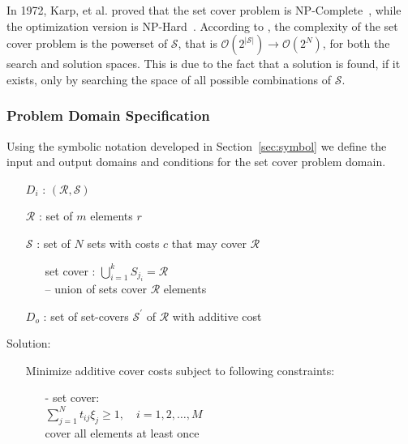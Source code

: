 \documentclass[conference]{IEEEtran}
\newcommand{\bigoh}[1]{\ensuremath{\mathcal{O}(#1)}}		%
\begin{document}
In 1972, Karp, et al. proved that the set cover problem is
NP-Complete~\cite{karp1972}, while the optimization version is
NP-Hard~\cite{wiki:SCP}. According to \cite{wiki:SCP, lamontSCP}, the
complexity of the set cover problem is the powerset of $\mathcal{S}$, that is
${\bigoh{2^{|\mathcal{S}|}} \rightarrow \bigoh{2^N}}$, for both the search and
solution spaces. This is due to the fact that a solution is found, if it
exists, only by searching the space of all possible combinations of
$\mathcal{S}$.

\subsubsection{Problem Domain Specification}
Using the symbolic notation developed in Section~\ref{sec:symbol} we define the
input and output domains and conditions for the set cover problem domain.

\begin{enumerate}
  \item[] $D_i$ : $(\mathcal{R,S})$
  \item[] $\mathcal{R}$ : set of $m$ elements $r$
  \item[] $\mathcal{S}$ : set of $N$ sets with costs $c$ that may cover
    $\mathcal{R}$
    \begin{enumerate}
      \item[] set cover : $\bigcup\limits_{i=1}^k S_{j_i} =
        \mathcal{R}$~\cite[Eq.~3.12]{christofides1975}\\ 
        -- union of sets cover $\mathcal{R}$
        elements
    \end{enumerate}
  \item[] $D_o$ : set of set-covers $\mathcal{S}^\prime$ of $\mathcal{R}$ with
    additive cost
\end{enumerate}

Solution:
\begin{enumerate}
  \item[] Minimize additive cover costs subject to following constraints:
    \begin{enumerate}
      \item[-] set cover:\\
        $\sum\limits_{j=1}^N t_{ij} \xi_j \geq 1, \quad i =
        1,2,\ldots,M$~\cite[Eq.  3.14]{christofides1975}\\
        cover all elements at least once
    \end{enumerate}
\end{enumerate}
\end{document}
